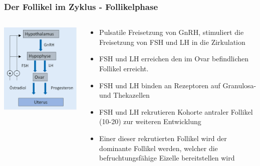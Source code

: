 \documentclass{beamer}
\begin{document}
\begin{frame}
\frametitle{Der Follikel im Zyklus - Follikelphase}


\begin{columns}[c]

\begin{column}{4cm}

\begin{center}
\includegraphics[width=\textwidth]{hypothalamus_hypophyse_ovar.png}
\end{center}

\end{column}

\begin{column}{7cm}

\begin{itemize}
\item
Pulsatile Freisetzung von GnRH, stimuliert die Freisetzung von FSH und LH in die Zirkulation
\item
FSH und LH erreichen den im Ovar befindlichen Follikel erreicht.
\item
FSH und LH binden an Rezeptoren auf Granulosa- und Thekazellen
\item
 FSH und LH rekrutieren Kohorte antraler Follikel (10-20) zur weiteren Entwicklung
\item
 Einer dieser rekrutierten Follikel wird der dominante Follikel werden, welcher die befruchtungsfähige Eizelle bereitstellen wird
\end{itemize}

\end{column}

\end{columns}

\end{frame}
\end{document}
